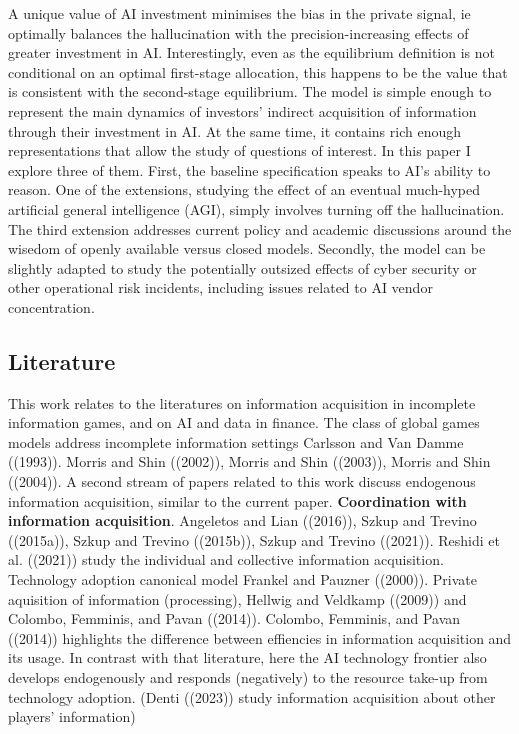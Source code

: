 \documentclass[
]{article}
\theoremstyle{plain}
\theoremstyle{definition}
\theoremstyle{remark}
\begin{document}
A unique value of AI investment minimises the bias in the private
signal, ie optimally balances the hallucination with the
precision-increasing effects of greater investment in AI. Interestingly,
even as the equilibrium definition is not conditional on an optimal
first-stage allocation, this happens to be the value that is consistent
with the second-stage equilibrium. The model is simple enough to
represent the main dynamics of investors' indirect acquisition of
information through their investment in AI. At the same time, it
contains rich enough representations that allow the study of questions
of interest. In this paper I explore three of them. First, the baseline
specification speaks to AI's ability to reason. One of the extensions,
studying the effect of an eventual much-hyped artificial general
intelligence (AGI), simply involves turning off the hallucination. The
third extension addresses current policy and academic discussions around
the wisedom of openly available versus closed models. Secondly, the
model can be slightly adapted to study the potentially outsized effects
of cyber security or other operational risk incidents, including issues
related to AI vendor concentration.

\hypertarget{literature}{%
\subsection{Literature}\label{literature}}

This work relates to the literatures on information acquisition in
incomplete information games, and on AI and data in finance. The class
of global games models address incomplete information settings Carlsson
and Van Damme ((1993)). Morris and Shin ((2002)), Morris and Shin
((2003)), Morris and Shin ((2004)). A second stream of papers related to
this work discuss endogenous information acquisition, similar to the
current paper. \textbf{Coordination with information acquisition}.
Angeletos and Lian ((2016)), Szkup and Trevino ((2015a)), Szkup and
Trevino ((2015b)), Szkup and Trevino ((2021)). Reshidi et al. ((2021))
study the individual and collective information acquisition. Technology
adoption canonical model Frankel and Pauzner ((2000)). Private
aquisition of information (processing), Hellwig and Veldkamp ((2009))
and Colombo, Femminis, and Pavan ((2014)). Colombo, Femminis, and Pavan
((2014)) highlights the difference between effiencies in information
acquisition and its usage. In contrast with that literature, here the AI
technology frontier also develops endogenously and responds (negatively)
to the resource take-up from technology adoption. (Denti ((2023)) study
information acquisition about other players' information)
\end{document}

